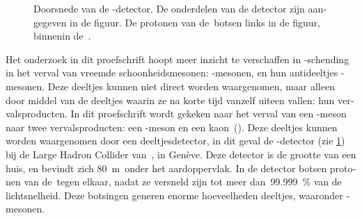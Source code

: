 \begin{otherlanguage}{dutch}
\begin{figure}[htb]
    \caption{
        Doorsnede van de \lhcb-detector.
        De onderdelen van de detector zijn aangegeven in de figuur.
        De protonen van de~\lhc botsen links in de figuur, binnenin de~\velo.}
    \label{fig:samenvatting_LHCb}
\end{figure}
%
Het onderzoek in dit proefschrift hoopt meer inzicht te verschaffen in \CP-schending in het verval van vreemde schoonheidsmesonen: \Bs-mesonen, en hun antideeltjes \Bsb-mesonen.
Deze deeltjes kunnen niet direct worden waargenomen, maar alleen door middel van de deeltjes waarin ze na korte tijd vanzelf uiteen vallen: hun vervalsproducten.
In dit proefschrift wordt gekeken naar het verval van een \Bs-meson naar twee vervalsproducten: een \Dsmp-meson en een kaon~(\Kpm).
Deze deeltjes kunnen worden waargenomen door een deeltjesdetector, in dit geval de \lhcb-detector (zie \cref{fig:samenvatting_LHCb}) bij de Large Hadron Collider van~\cern, in Gen\`eve.
Deze detector is de grootte van een huis, en bevindt zich \SI{80}{\metre}~onder het aardoppervlak.
In de detector botsen protonen van de~\lhc tegen elkaar, nadat ze versneld zijn tot meer dan~\SI{99.999}{\percent} van de lichtsnelheid.
Deze botsingen generen enorme hoeveelheden deeltjes, waaronder \Bs-mesonen.


\end{otherlanguage}
